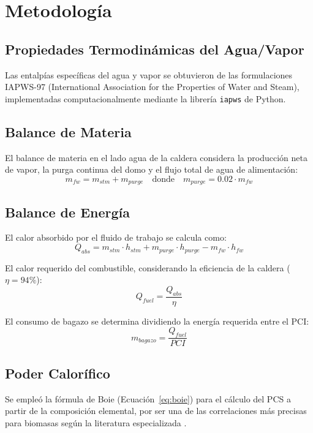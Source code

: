 \section{Metodología}

\subsection{Propiedades Termodinámicas del Agua/Vapor}
Las entalpías específicas del agua y vapor se obtuvieron de las formulaciones IAPWS-97 (International Association for the Properties of Water and Steam), implementadas computacionalmente mediante la librería \texttt{iapws} de Python.

\subsection{Balance de Materia}
El balance de materia en el lado agua de la caldera considera la producción neta de vapor, la purga continua del domo y el flujo total de agua de alimentación:
\begin{equation}
	m_{fw} = m_{stm} + m_{purge} \quad \text{donde} \quad m_{purge} = 0.02 \cdot m_{fw}
\end{equation}

\subsection{Balance de Energía}
El calor absorbido por el fluido de trabajo se calcula como:
\begin{equation}
	Q_{abs} = m_{stm} \cdot h_{stm} + m_{purge} \cdot h_{purge} - m_{fw} \cdot h_{fw}
\end{equation}

El calor requerido del combustible, considerando la eficiencia de la caldera ($\eta = 94\%$):
\begin{equation}
	Q_{fuel} = \frac{Q_{abs}}{\eta}
\end{equation}

El consumo de bagazo se determina dividiendo la energía requerida entre el PCI:
\begin{equation}
	m_{bagazo} = \frac{Q_{fuel}}{PCI}
\end{equation}

\subsection{Poder Calorífico}
Se empleó la fórmula de Boie (Ecuación~\ref{eq:boie}) para el cálculo del PCS a partir de la composición elemental, por ser una de las correlaciones más precisas para biomasas según la literatura especializada \cite{boie1953}.
